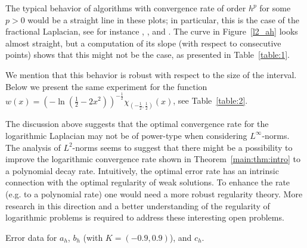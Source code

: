 \documentclass[11 pt]{article}
\numberwithin{equation}{section}
\begin{document}
The typical behavior of algorithms with convergence rate of order $h^p$ for some $p>0$ would be a straight line in these plots; in particular, this is the case of the fractional Laplacian, see for instance \cite[Figure 8]{BH17}, \cite[Figure 1]{AB17}, and \cite[Table 3]{HSJSS23}. The curve in Figure~\ref{l2_ah} looks almost straight, but a computation of its slope (with respect to consecutive points) shows that this might not be the case, as presented in Table~\ref{table:1}.

We mention that this behavior is robust with respect to the size of the interval.  Below we present the same experiment for the function 
$w(x)=\left(
-\ln\left(\frac{1}{2}-2x^2\right)\right)^{-\frac{1}{2}} \chi_{(-\frac{1}{2},\frac{1}{2})}(x)$, see Table~\ref{table:2}.

The discussion above suggests that the optimal convergence rate for the logarithmic Laplacian may not be of power-type when considering $L^\infty$-norms.  The analysis of $L^2$-norms seems to suggest that there might be a possibility to improve the logarithmic convergence rate shown in Theorem~\ref{main:thm:intro} to a polynomial decay rate. Intuitively, the optimal error rate has an intrinsic connection with the optimal regularity of weak solutions. To enhance the rate (e.g. to a polynomial rate) one would need a more robust regularity theory.  More research in this direction and a better understanding of the regularity of logarithmic problems is required to address these interesting open problems.

\begin{table}[htb]
\centering
%
\data
%
%
\pgfplotstabletypeset[clear infinite, empty cells with={\ensuremath{-}},
every head row/.style={
before row=\toprule,after row=\midrule},
every last row/.style={
after row=\bottomrule},
]{\data}
%
\caption{Error data  for $a_h$, $b_h$ (with $K=(-0.9,0.9)$), and $c_h$.}
\label{table:1}
\end{table}
\end{document}
